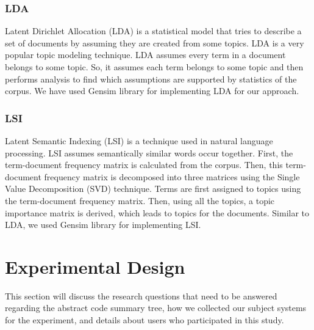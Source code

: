 \subsubsection{LDA}
Latent Dirichlet Allocation (LDA) \cite{blei2003latent} is a statistical model that tries to describe a set of documents by assuming they are created from some topics. LDA is a very popular topic modeling technique. LDA assumes every term in a document belongs to some topic. So, it assumes each term belongs to some topic and then performs analysis to find which assumptions are supported by statistics of the corpus. We have used Gensim \cite{gensim} library for implementing LDA for our approach.
\subsubsection{LSI}
Latent Semantic Indexing (LSI) \cite{deerwester1990indexing} is a technique used in natural language processing. LSI assumes semantically similar words occur together. First, the term-document frequency matrix is calculated from the corpus. Then, this term-document frequency matrix is decomposed into three matrices using the Single Value Decomposition (SVD) technique. Terms are first assigned to topics using the term-document frequency matrix. Then, using all the topics, a topic importance matrix is derived, which leads to topics for the documents. Similar to LDA, we used Gensim \cite{gensim} library for implementing LSI. 

\section{Experimental Design}
\label{Experimental}
This section will discuss the research questions that need to be answered regarding the abstract code summary tree, how we collected our subject systems for the experiment, and details about users who participated in this study.
